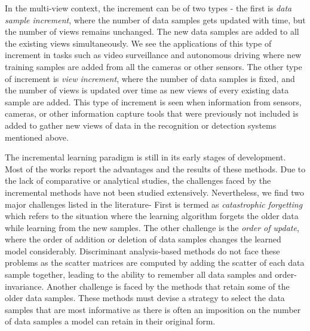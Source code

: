 In the multi-view context, the increment can be of two types - the first is \textit{data sample increment}, where the number of data samples gets updated with time, but the number of views remains unchanged. The new data samples are added to all the existing views simultaneously. We see the applications of this type of increment in tasks such as video surveillance \cite{LopezRPFL19} and autonomous driving \cite{OliveiraSSDM16} where new training samples are added from all the cameras or other sensors. The other type of increment is \textit{view increment}, where the number of data samples is fixed, and the number of views is updated over time as new views of every existing data sample are added. This type of increment is seen when information from sensors, cameras, or other information capture tools that were previously not included is added to gather new views of data in the recognition or detection systems mentioned above.

The incremental learning paradigm is still in its early stages of development. Most of the works report the advantages and the results of these methods. Due to the lack of comparative or analytical studies, the challenges faced by the incremental methods have not been studied extensively. Nevertheless, we find two major challenges listed in the literature- First is termed as \textit{catastrophic forgetting} which refers to the situation where the learning algorithm forgets the older data while learning from the new samples. The other challenge is the \textit{order of update}, where the order of addition or deletion of data samples changes the learned model considerably. Discriminant analysis-based methods do not face these problems as the scatter matrices are computed by adding the scatter of each data sample together, leading to the ability to remember all data samples and order-invariance. Another challenge is faced by the methods that retain some of the older data samples. These methods must devise a strategy to select the data samples that are most informative as there is often an imposition on the number of data samples a model can retain in their original form.

